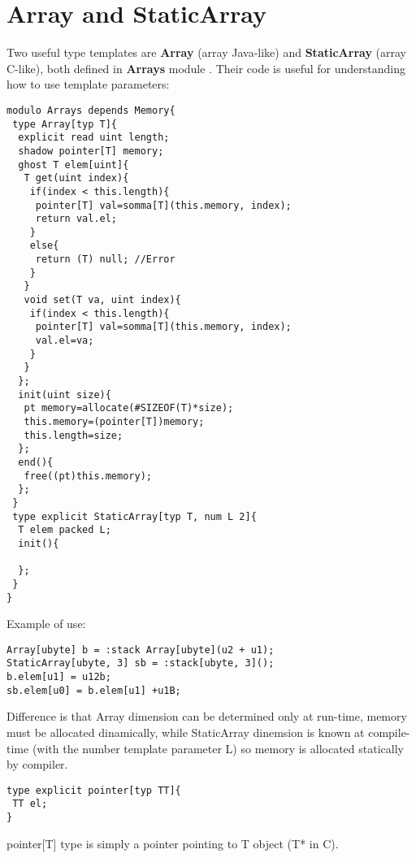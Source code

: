 \documentclass[10pt]{book}%
\renewcommand{\emph}[1]{\textbf{#1}}
\newenvironment{codeenv}{
\begin{mdframed}[backgroundcolor=black!20,topline=false,leftline=false,rightline=false,bottomline=false]
}
{\end{mdframed}}
\begin{document}
\chapter{Array and StaticArray}
Two useful type templates are \emph{Array} (array Java-like) and \emph{StaticArray} (array C-like), both defined in \emph{Arrays} module . Their code is useful for understanding how to use template parameters:
\begin{codeenv}
\begin{verbatim}
modulo Arrays depends Memory{
 type Array[typ T]{
  explicit read uint length;
  shadow pointer[T] memory;
  ghost T elem[uint]{
   T get(uint index){
    if(index < this.length){
     pointer[T] val=somma[T](this.memory, index);
     return val.el;
    }
    else{
     return (T) null; //Error
    }
   }
   void set(T va, uint index){
    if(index < this.length){
     pointer[T] val=somma[T](this.memory, index);
     val.el=va;
    }
   }
  };
  init(uint size){
   pt memory=allocate(#SIZEOF(T)*size);
   this.memory=(pointer[T])memory;
   this.length=size;
  };
  end(){
   free((pt)this.memory);
  };
 }
 type explicit StaticArray[typ T, num L 2]{
  T elem packed L;
  init(){
  
  };
 }
}
\end{verbatim}
\end{codeenv}

Example of use:
\begin{codeenv}
\begin{verbatim}
Array[ubyte] b = :stack Array[ubyte](u2 + u1);
StaticArray[ubyte, 3] sb = :stack[ubyte, 3]();
b.elem[u1] = u12b;
sb.elem[u0] = b.elem[u1] +u1B; 
\end{verbatim}
\end{codeenv}
Difference is that Array dimension can be determined only at run-time, memory must be allocated dinamically, while StaticArray dinemsion is known at compile-time (with the number template parameter L) so memory is allocated statically by compiler.

\begin{codeenv}
\begin{verbatim}
type explicit pointer[typ TT]{
 TT el;
}
\end{verbatim}
\end{codeenv}
pointer[T] type is simply a pointer pointing to T object (T* in C).
\end{document}
